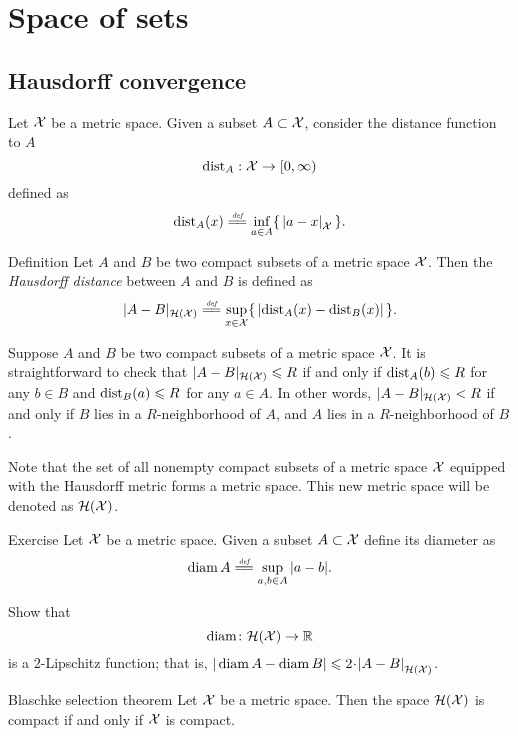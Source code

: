 \chapter{Space of sets}

\section{Hausdorff convergence}

Let $\mathcal{X}$ be a metric space.
Given a subset $A\subset \mathcal{X}$,
consider the distance function to $A$
$$\mathrm{dist}_A: \mathcal{X} \to [0,\infty)$$
defined as 
$$\distfun_A(x)
\df
\inf_{a\in A}\{\,\dist ax{\spc{X}}\,\}.$$

\begin{thm}{Definition}\label{def:hausdorff-convergence}
Let $A$ and $B$ be two compact subsets of a metric space $\mathcal{X}$.
Then the \emph{Hausdorff distance} between $A$ and $B$ is defined as 
$$|A-B|_{\mathcal{H}(\spc{X})}
\df
\sup_{x\in \spc{X}}\{\,|\distfun_A(x)-\distfun_B(x)|\,\}.
$$

\end{thm}
 
Suppose $A$ and $B$ be two compact subsets of a metric space $\mathcal{X}$.
It is straightforward to check that $|A-B|_{\mathcal{H}(\mathcal{X})}\leqslant R$ if and only if 
$\mathrm{dist}_A(b)\leqslant R$ for any $b\in B$
and 
$\mathrm{dist}_B(a)\leqslant R$ for any $a\in A$.
In other words, $|A-B|_{\mathcal{H}(\mathcal{X})}< R$ if and only if 
$B$ lies in a $R$-neighborhood of $A$, 
and 
$A$ lies in a $R$-neighborhood of $B$.

Note that the set of all nonempty compact subsets of a metric space $\mathcal{X}$ equipped with the Hausdorff metric forms a metric space.
This new metric space will be denoted as $\mathcal{H}(\mathcal{X})$.


\begin{thm}{Exercise}\label{ex:diam}
Let $\mathcal{X}$ be a metric space.
Given a subset $A\subset \mathcal{X}$ define its diameter as 
$$\diam A\df\sup_{a,b\in A} |a-b|.$$

Show that 
$$\operatorname{\rm diam}\nolimits\colon\mathcal{H}(\mathcal{X})\to \mathbb{R}$$ 
is a $2$-Lipschitz function;
that is, $|\diam A-\diam B|\le 2\cdot\dist{A}{B}{\mathcal{H}(\spc{X})}$.
\end{thm}


\begin{thm}{Blaschke selection theorem}\label{thm:compact+Hausdorff}
Let $\mathcal{X}$ be a metric space.
Then the space $\mathcal{H}(\mathcal{X})$ is compact if and only if $\mathcal{X}$ is compact.
\end{thm}

